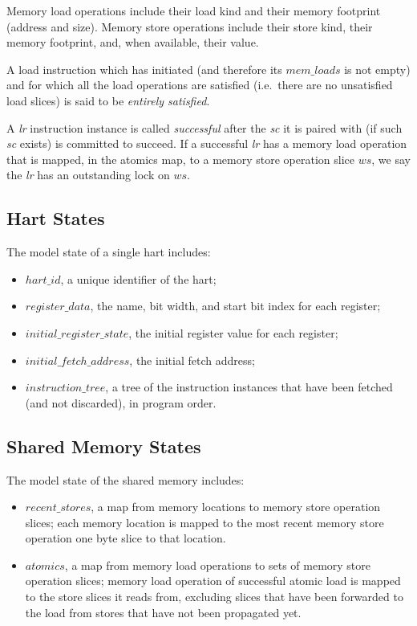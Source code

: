 Memory load operations include their load kind and their memory footprint (address and size).
%
Memory store operations include their store kind, their memory footprint, and, when available, their value.

A load instruction which has initiated (and therefore its $mem\_loads$ is not empty) and for which all the load operations are satisfied (i.e.~there are no unsatisfied load slices) is said to be {\em entirely satisfied}.

A {\em lr} instruction instance is called {\em successful} after the {\em sc} it is paired with (if such {\em sc} exists) is committed to succeed.
If a successful {\em lr} has a memory load operation that is mapped, in the atomics map, to a memory store operation slice $ws$, we say the {\em lr} has an outstanding lock on $ws$. 


\subsection{Hart States}
The model state of a single hart includes:
\begin{itemize}
\item $hart\_id$, a unique identifier of the hart;
\item $register\_data$, the name, bit width, and start bit index for each register;
\item $initial\_register\_state$, the initial register value for each register;
\item $initial\_fetch\_address$, the initial fetch address;
\item $instruction\_tree$, a tree of the instruction instances that have been fetched (and not discarded), in program order.
\end{itemize}


\subsection{Shared Memory States}
The model state of the shared memory includes:
\begin{itemize}
\item $recent\_stores$, a map from memory locations to memory store operation slices;
each memory location is mapped to the most recent memory store operation one byte slice to that location.
\item $atomics$, a map from memory load operations to sets of memory store operation slices;
memory load operation of successful atomic load is mapped to the store slices it reads from, excluding slices that have been forwarded to the load from stores that have not been propagated yet.
\end{itemize}



